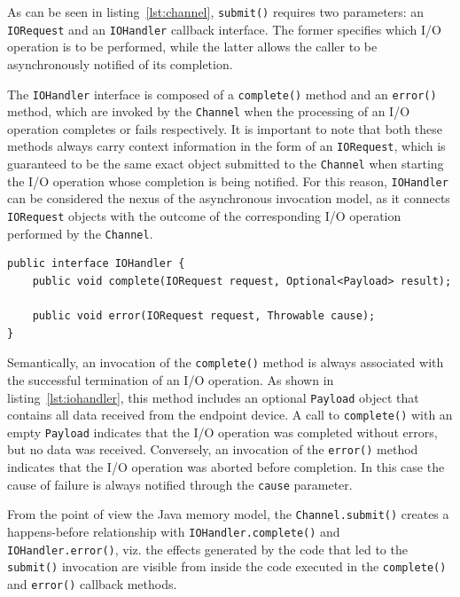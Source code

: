 As can be seen in listing~\ref{lst:channel}, \texttt{submit()} requires two parameters: an \texttt{IORequest} and an \texttt{IOHandler} callback interface. The former specifies which I/O operation is to be performed, while the latter allows the caller to be asynchronously notified of its completion.

The \texttt{IOHandler} interface is composed of a \texttt{complete()} method and an \texttt{error()} method, which are invoked by the \texttt{Channel} when the processing of an I/O operation completes or fails respectively. It is important to note that both these methods always carry context information in the form of an \texttt{IORequest}, which is guaranteed to be the same exact object submitted to the \texttt{Channel} when starting the I/O operation whose completion is being notified. For this reason, \texttt{IOHandler} can be considered the nexus of the asynchronous invocation model, as it connects \texttt{IORequest} objects with the outcome of the corresponding I/O operation performed by the \texttt{Channel}.

\lstset{language=Java}
\begin{lstlisting}[float,floatplacement=H,caption=The IOHandler interface,label={lst:iohandler}]
public interface IOHandler {
	public void complete(IORequest request, Optional<Payload> result);
	
	public void error(IORequest request, Throwable cause);
}
\end{lstlisting}

Semantically, an invocation of the \texttt{complete()} method is always associated with the successful termination of an I/O operation. As shown in listing~\ref{lst:iohandler}, this method includes an optional \texttt{Payload} object that contains all data received from the endpoint device. A call to \texttt{complete()} with an empty \texttt{Payload} indicates that the I/O operation was completed without errors, but no data was received. Conversely, an invocation of the \texttt{error()} method indicates that the I/O operation was aborted before completion. In this case the cause of failure is always notified through the \texttt{cause} parameter.

From the point of view the Java memory model, the \texttt{Channel.submit()} creates a happens-before relationship with \texttt{IOHandler.complete()} and \texttt{IOHandler.error()}, viz. the effects generated by the code that led to the \texttt{submit()} invocation are visible from inside the code executed in the \texttt{complete()} and \texttt{error()} callback methods.

